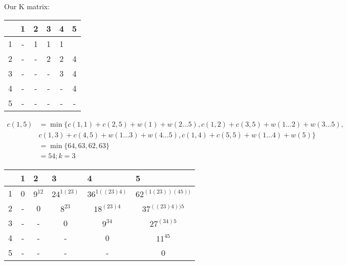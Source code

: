 \documentclass[12pt]{article}
\begin{document}
Our K matrix:\\
\begin{table}[h]
\centering
\begin{tabular}{|c|c|c|c|c|c|}
\hline
\multicolumn{1}{|l|}{} & \multicolumn{1}{|l|}{1} & \multicolumn{1}{l|}{2} & \multicolumn{1}{l|}{3} & \multicolumn{1}{l|}{4} & \multicolumn{1}{l|}{5} \\ \hline
1&  -                   &     1                 &       1               &          1            &                   \\ \hline
2&-                       & -                     &      2                 &       2               &    4               \\ \hline
3&-                       & -                     & -                     &     3                  &      4                 \\ \hline
4&-                       & -                     & -                     & -                     &   4                    \\ \hline
5&-                       & -                     & -                     & -                     &   -                   \\ \hline
\end{tabular}
\end{table}

\begin{align*}
c(1,5) & = \min \{ c(1,1) + c(2,5) + w(1) + w(2...5), c(1,2) + c(3,5) + w(1...2) + w(3...5),\\
	& c(1,3) + c(4,5) + w(1...3) + w(4...5), c(1,4) + c(5,5) + w(1...4) + w(5)\} \\
           & = \min\{64, 63, 62, 63  \}\\
           & =54; k=3\
\end{align*}

\begin{table}[h]
\centering
\begin{tabular}{|c|c|c|c|c|c|}
\hline
\multicolumn{1}{|l|}{} & \multicolumn{1}{|l|}{1} & \multicolumn{1}{l|}{2} & \multicolumn{1}{l|}{3} & \multicolumn{1}{l|}{4} & \multicolumn{1}{l|}{5} \\ \hline
1&0                       &       $9^{12} $             &          $24^{1(23)}$               &     $36^{1((23)4)}$                   &      $62^{(1(23))(45))}$         \\ \hline
2&-                       & 0                     &    $8^{23} $                  &     $18^{(23)4} $                   &  $37^{((23)4))5}$                 \\ \hline
3&-                       & -                     & 0                     &      $ 9^{34} $                  &    $27^{(34)5}$                     \\ \hline
4&-                       & -                     & -                     & 0                     &        $11^{45}$                \\ \hline
5&-                       & -                     & -                     & -                     &    0                   \\ \hline
\end{tabular}
\end{table}
\end{document}
